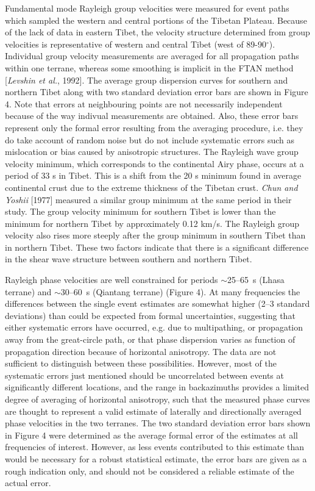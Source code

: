 \documentclass[12pt]{article}
\begin{document}
Fundamental mode Rayleigh group velocities were measured for event paths which sampled the western and
central portions of the Tibetan Plateau. Because of the lack of data in eastern Tibet, the velocity
structure determined from group velocities is representative of western and central Tibet (west of
89-90$^\circ$).  Individual group velocity measurements are averaged for all propagation
paths within one terrane, whereas some smoothing is implicit in
the FTAN method [{\it Levshin et al.}, 1992].   The average group dispersion curves for southern and northern Tibet along with
two standard deviation error bars are shown in Figure 4.  Note that
errors at
neighbouring points are not necessarily independent because of the way
indivual measurements are obtained. Also, these error bars represent only the formal error resulting from the averaging procedure, i.e. they do take account of random noise but do not include systematic errors such as mislocation or bias caused by anisotropic structures.  The Rayleigh wave group velocity minimum, which
corresponds to the continental Airy phase, occurs at a period of 33 s in Tibet.  This is a shift from the
20 s minimum found in average continental crust due to the extreme thickness of the Tibetan crust.  {\it
Chun and Yoshii} [1977] measured a similar group minimum at the same period in their study. The group
velocity minimum for southern Tibet is lower than the minimum for northern Tibet by approximately 0.12
km/s.  The Rayleigh group velocity also rises more steeply after the group minimum in southern Tibet than
in northern Tibet.  These two factors indicate that there is a significant difference in the shear wave
structure between southern and northern Tibet.

Rayleigh phase velocities are well constrained for periods $\sim$25--65~s (Lhasa terrane) and
$\sim$30--60~s (Qiantang terrane) (Figure 4).  At many frequencies the differences between the single event
estimates are somewhat higher (2--3 standard deviations) than could be expected from formal uncertainties, suggesting that either
systematic errors have occurred, e.g. due to multipathing, or propagation away from the great-circle path,
or that phase dispersion varies as function of propagation direction because of horizontal anisotropy. The
data are not sufficient to distinguish between these possibilities.  However, most of the systematic errors
just mentioned should be uncorrelated between events at significantly different locations, and the range in
backazimuths provides a limited degree of averaging of horizontal anisotropy, such that the measured phase
curves are thought to represent a valid estimate of laterally and directionally averaged phase velocities
in the two terranes.  The two standard deviation error bars shown
in Figure 4 were determined as the average formal error of the estimates at all frequencies of interest.  However, as less events contributed to this estimate than would be necessary for a robust statistical estimate, the error bars are given as a rough indication only, and should not be considered a reliable estimate of the actual error.
\end{document}
